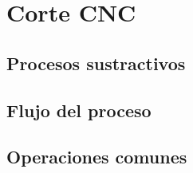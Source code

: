 \chapter{Corte CNC}

\section{Procesos sustractivos}

\section{Flujo del proceso}

\section{Operaciones comunes}